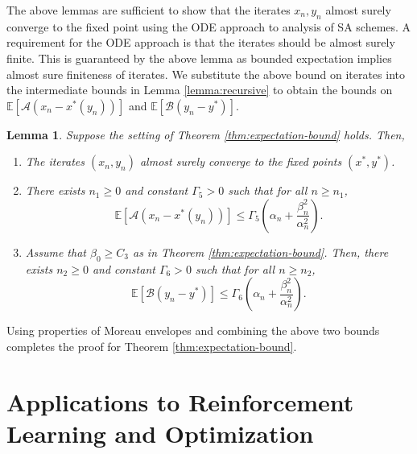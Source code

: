 \documentclass[letterpaper, 10 pt, conference]{ieeeconf}  %
\theoremstyle{definition}
\theoremstyle{plain}
\newtheorem{lemma}{Lemma}
\newcommand{\xstar}{x^*}
\newcommand{\ystar}{y^*}
\newcommand{\EE}{\mathbb{E}}
\newcommand{\Acal}{\mathcal{A}}
\newcommand{\Bcal}{\mathcal{B}}
\begin{document}
The above lemmas are sufficient to show that the iterates $x_n,y_n$ almost surely converge to the fixed point using the ODE approach to analysis of SA schemes. A requirement for the ODE approach is that the iterates should be almost surely finite. This is guaranteed by the above lemma as bounded expectation implies almost sure finiteness of iterates. We substitute the above bound on iterates into the intermediate bounds in Lemma \ref{lemma:recursive} to obtain the bounds on $\EE[\Acal(x_n-\xstar(y_n))]$ and $\EE[\Bcal(y_n-\ystar)]$.
\begin{lemma}\label{lemma:almost-done}
    Suppose the setting of Theorem \ref{thm:expectation-bound} holds. Then,
    \begin{enumerate}[label=(\alph*)]
        \item The iterates $(x_n,y_n)$ almost surely converge to the fixed points $(\xstar,\ystar)$.
        \item There exists $n_1\geq 0$ and constant $\Gamma_5>0$ such that for all $n\geq n_1$,
        $$
        \EE[\Acal(x_n-\xstar(y_n))]\leq \Gamma_5\left(\alpha_n+\frac{\beta_n^2}{\alpha_n^2}\right).$$
        \item Assume that $\beta_0\geq C_3$ as in Theorem \ref{thm:expectation-bound}. Then, there exists $n_2\geq 0$ and constant $\Gamma_6>0$ such that for all $n\geq n_2$,
        $$
        \EE[\Bcal(y_n-\ystar)]\leq \Gamma_6\left(\alpha_n+\frac{\beta_n^2}{\alpha_n^2}\right).$$
    \end{enumerate}
\end{lemma}

Using properties of Moreau envelopes and combining the above two bounds completes the proof for Theorem \ref{thm:expectation-bound}.


\section{Applications to Reinforcement Learning and Optimization}\label{sec:applications}
\end{document}
